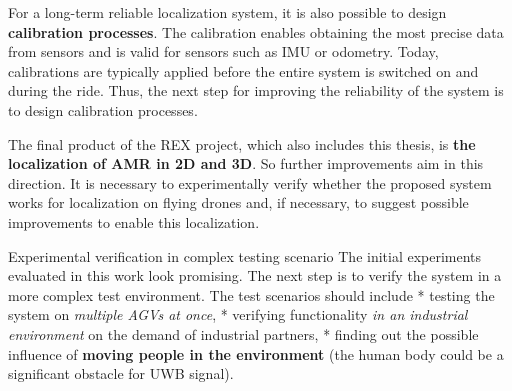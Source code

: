 	For a long-term reliable localization system, it is also possible to design {\bf calibration processes}. The calibration enables obtaining the most precise data from sensors and is valid for sensors such as IMU or odometry. Today, calibrations are typically applied before the entire system is switched on and during the ride. Thus, the next step for improving the reliability of the system is to design calibration processes.
	
	The final product of the REX project, which also includes this thesis, is {\bf the localization of AMR in 2D and 3D}. So further improvements aim in this direction. It is necessary to experimentally verify whether the proposed system works for localization on flying drones and, if necessary, to suggest possible improvements to enable this localization.

\secc Experimental verification in complex testing scenario
The initial experiments evaluated in this work look promising. The next step is to verify the system in a more complex test environment. The test scenarios should include
	\begitems
	* testing the system on {\it multiple AGVs at once}, 
	* verifying functionality {\it in an industrial environment} on the demand of industrial partners,
	* finding out the possible influence of {\bf moving people in the environment} (the human body could be a significant obstacle for UWB signal).
	\enditems